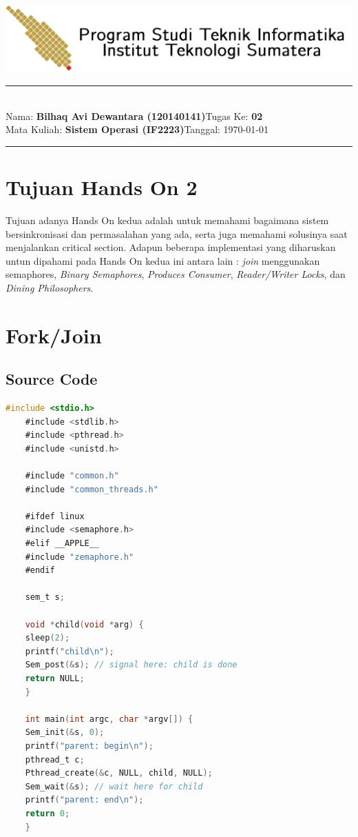 \documentclass[11pt,a4paper]{article}
\newcommand{\stuid}{120140141}
\newcommand{\student}{\textbf{Bilhaq Avi Dewantara (\stuid{})}}
\newcommand{\course}{\textbf{Sistem Operasi (IF2223)}}
\newcommand{\assignment}{\textbf{02}} %
\begin{document}
\thispagestyle{empty}
\begin{center}
	\includegraphics[scale = 0.15]{Figure/ifitera-header.png}
	\vspace{0.1cm}
\end{center}
\noindent
{\large
\rule{17cm}{0.2cm}\\[0.3cm]
Nama: \student \hfill Tugas Ke: \assignment\\[0.1cm]
Mata Kuliah: \course \hfill Tanggal: \today\\
\rule{17cm}{0.05cm}
\vspace{0.1cm}
}


\section{Tujuan Hands On 2}
    Tujuan adanya Hands On kedua adalah untuk memahami bagaimana sistem bersinkronisasi dan permasalahan yang ada, serta juga memahami solusinya saat menjalankan critical section.
	Adapun beberapa implementasi yang diharuskan untun dipahami pada Hands On kedua ini antara lain : \textit{join} menggunakan semaphores, \textit{Binary Semaphores}, 
	\textit{Produces Consumer}, \textit{Reader/Writer Locks}, dan \textit{Dining Philosophers}.


\section{Fork/Join}
\subsection{Source Code}
\begin{lstlisting}[language=C]
	#include <stdio.h>
	#include <stdlib.h>
	#include <pthread.h>
	#include <unistd.h>

	#include "common.h"
	#include "common_threads.h"

	#ifdef linux
	#include <semaphore.h>
	#elif __APPLE__
	#include "zemaphore.h"
	#endif

	sem_t s;

	void *child(void *arg) {
	sleep(2);
	printf("child\n");
	Sem_post(&s); // signal here: child is done
	return NULL;
	}

	int main(int argc, char *argv[]) {
	Sem_init(&s, 0); 
	printf("parent: begin\n");
	pthread_t c;
	Pthread_create(&c, NULL, child, NULL);
	Sem_wait(&s); // wait here for child
	printf("parent: end\n");
	return 0;
	}
	\end{lstlisting}
\end{document}
